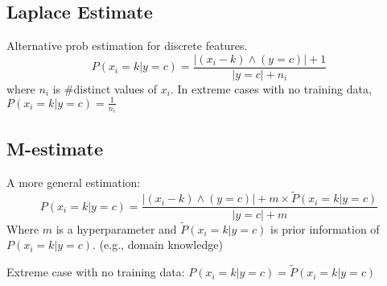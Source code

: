 \subsection*{Laplace Estimate}
Alternative prob estimation for discrete features.
\[P(x_i = k| y = c) = \frac{|(x_i - k)\wedge (y=c)|+1}{|y=c|+n_i}\]
where $n_i$ is \#distinct values of $x_i$.
In extreme cases with no training data, $P(x_i = k| y = c) = \frac{1}{n_i}$\\

\subsection*{M-estimate}
A more general estimation:
\[P(x_i = k| y = c) = \frac{|(x_i - k)\wedge (y=c)|+m\times \tilde{P}(x_i = k| y = c)}{|y=c|+m}\]
Where $m$ is a hyperparameter and $\tilde{P}(x_i = k| y = c)$ is prior information of ${P}(x_i = k| y = c)$. 
(e.g., domain knowledge)

Extreme case with no training data: $P(x_i = k| y = c) = \tilde{P}(x_i = k| y = c)$
